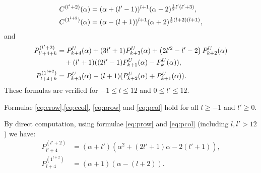 \mdef   \label{pa:able} 
\begin{align}
    C^{(l'+2)}(\alpha)&=(\alpha+(l'-1))^{l+1}(\alpha-2)^{\frac{1}{2}l'(l'+3)},\label{eq:crow}\\
    C^{(1^{l+2})}(\alpha)&=(\alpha-(l+1))^{l+1}(\alpha+2)^{\frac{1}{2}(l+2)(l+1)},\label{eq:ccol}
\end{align}
and
\begin{align}P^{(l'+2)}_{l'+4+k}&=P_{k+4}^U(\alpha)+(3 l'+1) P_{k+3}^U(\alpha)+
\left(2 l'^2-l'-2\right)P_{k+2}^U(\alpha)\nonumber\\
&\quad+(l'+1)((2l'-1)P^U_{k+1}(\alpha)-P^U_{k}(\alpha)),\label{eq:prow}\\
P^{(1^{l+2})}_{l+4+k}&=P_{k+3}^U(\alpha)-(l+1)(P_{k+2}^U(\alpha)+P_{k+1}^U(\alpha)).\label{eq:pcol}\end{align}
These formulas are verified for $-1\leq l\leq 12$ and $0\leq l'\leq 12$.

\begin{conjecture} Formulae \eqref{eq:crow},\eqref{eq:ccol}, \eqref{eq:prow} and \eqref{eq:pcol} hold for all $l\geq -1$ and $l'\geq 0$. 
\end{conjecture}

\mdef By direct computation, using formulae \eqref{eq:prow} and \eqref{eq:pcol} (including $l,l'>12$) we have:
\begin{align}
    P^{(l'+2)}_{l'+4}&=(\alpha +l') \left(\alpha ^2+(2l'+1)\alpha -2(l'+1)\right), \label{eq:row0}\\
    P^{(1^{l+2})}_{l+4}&=(\alpha +1) (\alpha- (l+2) ). \label{eq:col0}
\end{align}


